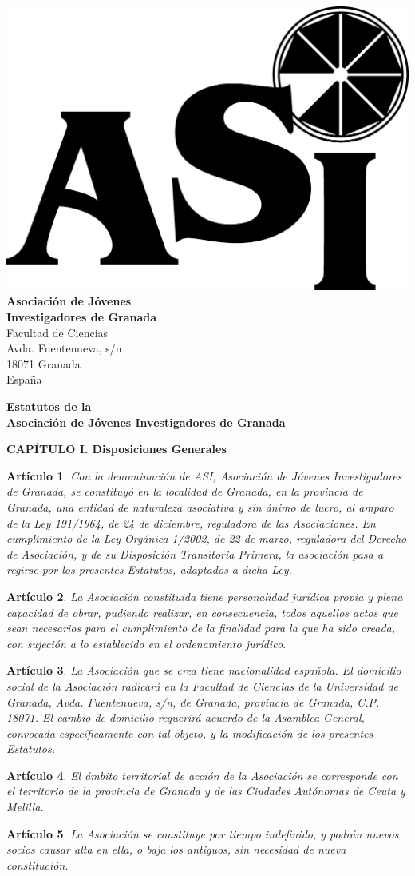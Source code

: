 \documentclass[a4paper,12pt]{article}
\theoremstyle{mystyle}		%
\newtheorem{art}{Artículo}	%
\def\membrete{
\hfill\parbox{8cm}{\raggedright
\begin{center}
\vspace{-10mm}
\footnotesize\sf
\includegraphics[scale=0.2]{LogoASI-Granada}\\
{\bf Asociación de Jóvenes\\
Investigadores de Granada}\\
Facultad de Ciencias\\
Avda. Fuentenueva, s/n\\
18071 Granada\\
España
\vspace{10pt}
\end{center}}}
\begin{document}
\begin{onehalfspace}

\membrete

\begin{center}
\Large{\bf Estatutos de la\\ Asociación de Jóvenes Investigadores de Granada}
\end{center}

\bigskip

\begin{center}
\textbf{CAPÍTULO I. Disposiciones Generales}
\end{center}

\begin{art}
Con la denominación de ASI, Asociación de Jóvenes Investigadores de Granada, se constituyó en la localidad de Granada, en la provincia de Granada, una entidad de naturaleza asociativa y sin ánimo de lucro, al amparo de la Ley 191/1964, de 24 de diciembre, reguladora de las Asociaciones. En cumplimiento de la Ley Orgánica 1/2002, de 22 de marzo, reguladora del Derecho de Asociación, y de su Disposición Transitoria Primera, la asociación pasa a regirse por los presentes Estatutos, adaptados a dicha Ley.
\end{art}

\begin{art}
La Asociación constituida tiene personalidad jurídica propia y plena capacidad de obrar, pudiendo realizar, en consecuencia, todos aquellos actos que sean necesarios para el cumplimiento de la finalidad para la que ha sido creada, con sujeción a lo establecido en el ordenamiento jurídico.
\end{art}

\begin{art}
La Asociación que se crea tiene nacionalidad española. El domicilio social de la Asociación radicará en la Facultad de Ciencias de la Universidad de Granada, Avda. Fuentenueva, s/n, de Granada, provincia de Granada, C.P. 18071. El cambio de domicilio requerirá acuerdo de la Asamblea General, convocada específicamente con tal objeto, y la modificación de los presentes Estatutos.
\end{art}

\begin{art}
El ámbito territorial de acción de la Asociación se corresponde con el territorio de la provincia de Granada y de las Ciudades Autónomas de Ceuta y Melilla.
\end{art}

\begin{art}
La Asociación se constituye por tiempo indefinido, y podrán nuevos socios causar alta en ella, o baja los antiguos, sin necesidad de nueva constitución.
\end{art}


\end{onehalfspace}
\end{document}
